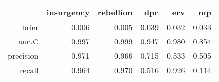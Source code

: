 \begin{tabular}{rrrrrr}
  \hline
 & insurgency & rebellion & dpc & erv & mp \\ 
  \hline
brier & 0.006 & 0.005 & 0.039 & 0.032 & 0.033 \\ 
  auc.C & 0.997 & 0.999 & 0.947 & 0.980 & 0.854 \\ 
  precision & 0.971 & 0.966 & 0.715 & 0.533 & 0.505 \\ 
  recall & 0.964 & 0.970 & 0.516 & 0.926 & 0.114 \\ 
   \hline
\end{tabular}
